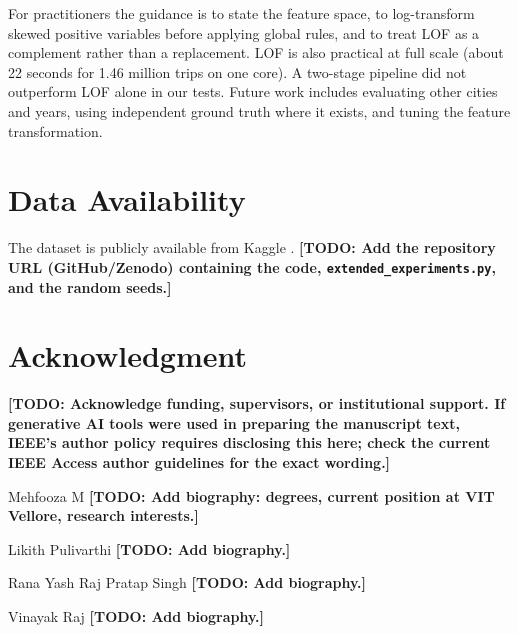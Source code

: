 \documentclass{ieeeaccess}
\newcommand{\todo}[1]{{\color{red}\textbf{[TODO: #1]}}}
\begin{document}
For practitioners the guidance is to state the feature space, to log-transform skewed positive variables before applying global rules, and to treat LOF as a complement rather than a replacement. LOF is also practical at full scale (about 22 seconds for 1.46 million trips on one core). A two-stage pipeline did not outperform LOF alone in our tests. Future work includes evaluating other cities and years, using independent ground truth where it exists, and tuning the feature transformation.

\section*{Data Availability}
The dataset is publicly available from Kaggle \cite{tlc2016}. \todo{Add the repository URL (GitHub/Zenodo) containing the code, \texttt{extended\_experiments.py}, and the random seeds.}

\section*{Acknowledgment}
\todo{Acknowledge funding, supervisors, or institutional support. If generative AI tools were used in preparing the manuscript text, IEEE's author policy requires disclosing this here; check the current IEEE Access author guidelines for the exact wording.}




\begin{IEEEbiographynophoto}{Mehfooza M}
\todo{Add biography: degrees, current position at VIT Vellore, research interests.}
\end{IEEEbiographynophoto}

\begin{IEEEbiographynophoto}{Likith Pulivarthi}
\todo{Add biography.}
\end{IEEEbiographynophoto}

\begin{IEEEbiographynophoto}{Rana Yash Raj Pratap Singh}
\todo{Add biography.}
\end{IEEEbiographynophoto}

\begin{IEEEbiographynophoto}{Vinayak Raj}
\todo{Add biography.}
\end{IEEEbiographynophoto}

\EOD
\end{document}
